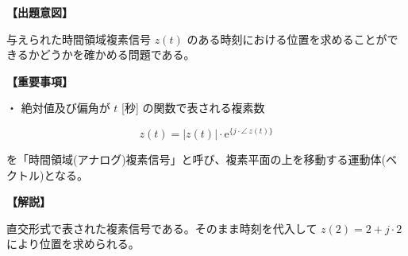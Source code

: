 \noindent \textbf{【出題意図】}

\bigskip
\noindent 与えられた時間領域複素信号 $z(t)$ のある時刻における位置を求めることができるかどうかを確かめる問題である。

\vspace{1em}
\noindent \textbf{【重要事項】}

\bigskip
\noindent ・ 絶対値及び偏角が $t$ [秒] の関数で表される複素数

\[
z(t) = |z(t)| \cdot \textrm{e}^{\{j \cdot \angle \ z(t)\}}
\]

\medskip
\noindent を「時間領域(アナログ)複素信号」と呼び、複素平面の上を移動する運動体(ベクトル)となる。

\vspace{1em}
\noindent \textbf{【解説】}

\bigskip
\noindent 直交形式で表された複素信号である。そのまま時刻を代入して $z(2) = 2 + j \cdot 2$ により位置を求められる。
